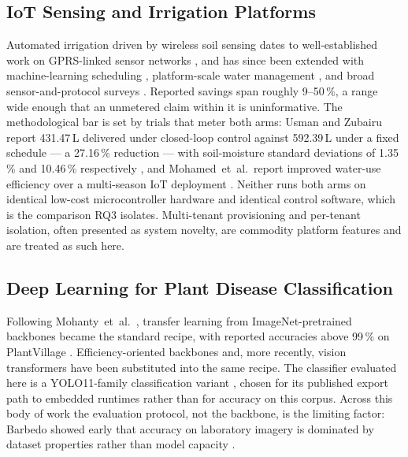 \documentclass[journal]{IEEEtran}
\begin{document}
\subsection{IoT Sensing and Irrigation Platforms}

Automated irrigation driven by wireless soil sensing dates to
well-established work on GPRS-linked sensor networks
\cite{gutierrez2014automated}, and has since been extended with
machine-learning scheduling \cite{goap2018iot}, platform-scale water
management \cite{kamienski2019swamp}, and broad sensor-and-protocol surveys
\cite{garcia2020iot,vallejo2023smart}. Reported savings span roughly
9--50\,\%, a range wide enough that an unmetered claim within it is
uninformative. The methodological bar is set by trials that meter both
arms: Usman and Zubairu report 431.47\,L delivered under closed-loop
control against 592.39\,L under a fixed schedule --- a 27.16\,\% reduction
--- with soil-moisture standard deviations of 1.35\,\% and 10.46\,\%
respectively \cite{usman2026aiirrigation}, and Mohamed~et~al.\ report
improved water-use efficiency over a multi-season IoT deployment
\cite{mohamed2026iotirrigation}. Neither runs both arms on identical
low-cost microcontroller hardware and identical control software, which is
the comparison RQ3 isolates. Multi-tenant provisioning and per-tenant
isolation, often presented as system novelty, are commodity platform
features \cite{thingsboard,openremote} and are treated as such here.

\subsection{Deep Learning for Plant Disease Classification}

Following Mohanty~et~al.\ \cite{mohanty2016deep}, transfer learning from
ImageNet-pretrained backbones \cite{deng2009imagenet,he2016resnet,
szegedy2016inception} became the standard recipe, with reported accuracies
above 99\,\% on PlantVillage
\cite{ferentinos2018deep,too2019comparative,sladojevic2016deep,brahimi2017deep}.
Efficiency-oriented backbones \cite{howard2017mobilenets,sandler2018mobilenetv2,
tan2019efficientnet} and, more recently, vision transformers
\cite{dosovitskiy2021vit} have been substituted into the same recipe. The
classifier evaluated here is a YOLO11-family classification variant
\cite{ultralytics2024yolo11,redmon2016yolo}, chosen for its published
export path to embedded runtimes rather than for accuracy on this corpus.
Across this body of work the evaluation protocol, not the backbone, is the
limiting factor: Barbedo showed early that accuracy on laboratory imagery
is dominated by dataset properties rather than model capacity
\cite{barbedo2018factors}.
\end{document}

